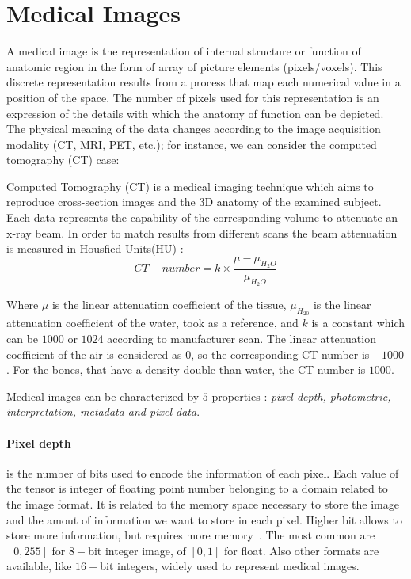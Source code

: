 \documentclass{standalone}
\begin{document}
	\section{Medical Images}
	
	A medical image is the representation of internal structure or function of anatomic region in the form of array of picture elements (pixels/voxels). 
	This discrete representation results from a process that map each numerical value in a position of the space. The number of pixels used for this representation is an expression of the details with which the anatomy of function can be depicted.  The physical meaning of the data changes according to the image acquisition modality (CT, MRI, PET, etc.); 	for instance, we can consider the computed tomography (CT) case: 
	
	 Computed Tomography (CT) is a medical imaging technique which aims to reproduce  cross-section images and the 3D anatomy of the examined subject. Each data represents the capability  of the corresponding volume to attenuate an x-ray beam. In order to match results from different scans the beam attenuation is measured in Housfied Units(HU) : 
	\begin{equation}\label{eq:HU}
		CT-number = k\times\frac{\mu - \mu_{H_2O}}{\mu_{H_2O}}
	\end{equation}
	
	Where $\mu$ is the linear attenuation coefficient of the tissue, $\mu_{H_20}$ is the linear attenuation coefficient of the water, took as a reference, and $k$ is a constant which can be $1000$ or $1024$ according to manufacturer scan. The linear attenuation coefficient of the air is considered as $0$, so the corresponding CT number is $-1000$. For the bones, that have a density double than water, the CT number is $1000$.
	
	Medical images can be characterized by $5$ properties : \emph{pixel depth, photometric, interpretation, metadata and pixel data}. 
	
	\paragraph*{Pixel depth} is the number of bits used to encode the information of each pixel. Each value of the tensor is integer of floating point number belonging to a domain related to the image format. It is related to the memory space necessary to store the image and the amout of information we want to store in each pixel. Higher bit allows to store more information, but requires more memory~\cite{ART:Larobina}. The most common are $[0, 255]$ for $8-$bit integer image, of $[0, 1]$ for float. Also other formats are available, like $16-$bit integers, widely used to represent medical images. 
	
\end{document}
